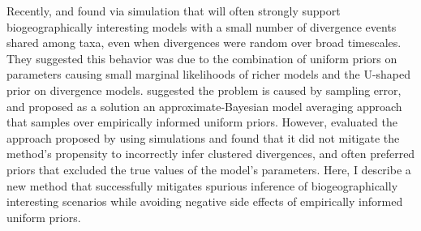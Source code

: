 Recently, \cite{Oaks2012} and \cite{Oaks2014reply} found via simulation that
\msb will often strongly support biogeographically interesting models with a
small number of divergence events shared among taxa, even when divergences were
random over broad timescales.
They suggested this behavior was due to the combination of uniform priors on
parameters causing small marginal likelihoods of richer models and the
U-shaped prior on divergence models.
\cite{Hickerson2013} suggested the problem is caused by sampling error, and
proposed as a solution an approximate-Bayesian model averaging approach that
samples over empirically informed uniform priors.
However, \cite{Oaks2014reply} evaluated the approach proposed by
\cite{Hickerson2013} using simulations and found that it did not mitigate the
method's propensity to incorrectly infer clustered divergences, and often
preferred priors that excluded the true values of the model's parameters.
Here, I describe a new method that successfully mitigates spurious inference
of biogeographically interesting scenarios while avoiding negative side effects
of empirically informed uniform priors.



